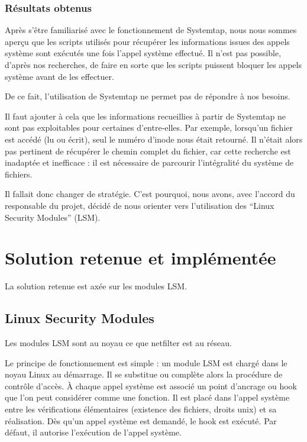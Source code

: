 \documentclass[pdftex,a4paper,titlepage,11pt]{article}
\begin{document}
\subsubsection{Résultats obtenus}

Après s'être familiarisé avec le fonctionnement de Systemtap, nous nous sommes aperçu que les scripts utilisés pour récupérer les informations issues des appels système sont exécutés une fois l'appel système effectué. Il n'est pas possible, d'après nos recherches, de faire en sorte que les scripts puissent bloquer les appels système avant de les effectuer.

De ce fait, l'utilisation de Systemtap ne permet pas de répondre à nos besoins.

Il faut ajouter à cela que les informations recueillies à partir de Systemtap ne sont pas exploitables pour certaines d'entre-elles. Par exemple, lorsqu'un fichier est accédé (lu ou écrit), seul le numéro d'inode nous était retourné. Il n'était alors pas pertinent de récupérer le chemin complet du fichier, car cette recherche est inadaptée et inefficace : il est nécessaire de parcourir l'intégralité du système de fichiers.

Il fallait donc changer de stratégie. C'est pourquoi, nous avons, avec l'accord du responsable du projet, décidé de nous orienter vers l'utilisation des ``Linux Security Modules'' (LSM).

\section{Solution retenue et implémentée}

La solution retenue est axée sur les modules LSM.

\subsection{Linux Security Modules}

Les modules LSM sont au noyau ce que netfilter est au réseau.

Le principe de fonctionnement est simple : un module LSM est chargé dans le noyau Linux au démarrage. Il se substitue ou complète alors la procédure de contrôle d'accès. \`A chaque appel système est associé un point d'ancrage ou hook que l'on peut considérer comme une fonction. Il est placé dans l'appel système entre les vérifications élémentaires (existence des fichiers, droits unix) et sa réalisation. Dès qu'un appel système est demandé, le hook est exécuté. Par défaut, il autorise l'exécution de l'appel système.
\end{document}
